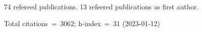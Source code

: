 74 refereed publications. 13 refeered publications as first author.

Total citations~=~3062; h-index~=~31 (2023-01-12)